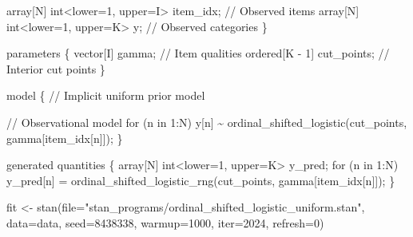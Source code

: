 \documentclass[
  letterpaper,
  DIV=11,
  numbers=noendperiod]{scrartcl}
\newenvironment{Shaded}{\begin{snugshade}}{\end{snugshade}}
\newcommand{\AttributeTok}[1]{\textcolor[rgb]{0.40,0.45,0.13}{#1}}
\newcommand{\CommentTok}[1]{\textcolor[rgb]{0.37,0.37,0.37}{#1}}
\newcommand{\ControlFlowTok}[1]{\textcolor[rgb]{0.00,0.23,0.31}{#1}}
\newcommand{\DataTypeTok}[1]{\textcolor[rgb]{0.68,0.00,0.00}{#1}}
\newcommand{\DecValTok}[1]{\textcolor[rgb]{0.68,0.00,0.00}{#1}}
\newcommand{\FunctionTok}[1]{\textcolor[rgb]{0.28,0.35,0.67}{#1}}
\newcommand{\KeywordTok}[1]{\textcolor[rgb]{0.00,0.23,0.31}{#1}}
\newcommand{\NormalTok}[1]{\textcolor[rgb]{0.00,0.23,0.31}{#1}}
\newcommand{\OtherTok}[1]{\textcolor[rgb]{0.00,0.23,0.31}{#1}}
\newcommand{\StringTok}[1]{\textcolor[rgb]{0.13,0.47,0.30}{#1}}
\begin{document}
\begin{codelisting}
\begin{Shaded}
\begin{Highlighting}[]
  \DataTypeTok{array}\NormalTok{[N] }\DataTypeTok{int}\NormalTok{\textless{}}\KeywordTok{lower}\NormalTok{=}\DecValTok{1}\NormalTok{, }\KeywordTok{upper}\NormalTok{=I\textgreater{} item\_idx; }\CommentTok{// Observed items}
  \DataTypeTok{array}\NormalTok{[N] }\DataTypeTok{int}\NormalTok{\textless{}}\KeywordTok{lower}\NormalTok{=}\DecValTok{1}\NormalTok{, }\KeywordTok{upper}\NormalTok{=K\textgreater{} y;        }\CommentTok{// Observed categories}
\NormalTok{\}}

\KeywordTok{parameters}\NormalTok{ \{}
  \DataTypeTok{vector}\NormalTok{[I] gamma;           }\CommentTok{// Item qualities}
  \DataTypeTok{ordered}\NormalTok{[K {-} }\DecValTok{1}\NormalTok{] cut\_points; }\CommentTok{// Interior cut points}
\NormalTok{\}}

\KeywordTok{model}\NormalTok{ \{}
  \CommentTok{// Implicit uniform prior model}

  \CommentTok{// Observational model}
  \ControlFlowTok{for}\NormalTok{ (n }\ControlFlowTok{in} \DecValTok{1}\NormalTok{:N)}
\NormalTok{    y[n] \textasciitilde{} ordinal\_shifted\_logistic(cut\_points, gamma[item\_idx[n]]);}
\NormalTok{\}}

\KeywordTok{generated quantities}\NormalTok{ \{}
  \DataTypeTok{array}\NormalTok{[N] }\DataTypeTok{int}\NormalTok{\textless{}}\KeywordTok{lower}\NormalTok{=}\DecValTok{1}\NormalTok{, }\KeywordTok{upper}\NormalTok{=K\textgreater{} y\_pred;}
  \ControlFlowTok{for}\NormalTok{ (n }\ControlFlowTok{in} \DecValTok{1}\NormalTok{:N)}
\NormalTok{    y\_pred[n] = ordinal\_shifted\_logistic\_rng(cut\_points,}
\NormalTok{                                             gamma[item\_idx[n]]);}
\NormalTok{\}}
\end{Highlighting}
\end{Shaded}

\end{codelisting}

\begin{Shaded}
\begin{Highlighting}[]
\NormalTok{fit }\OtherTok{\textless{}{-}} \FunctionTok{stan}\NormalTok{(}\AttributeTok{file=}\StringTok{"stan\_programs/ordinal\_shifted\_logistic\_uniform.stan"}\NormalTok{,}
            \AttributeTok{data=}\NormalTok{data, }\AttributeTok{seed=}\DecValTok{8438338}\NormalTok{,}
            \AttributeTok{warmup=}\DecValTok{1000}\NormalTok{, }\AttributeTok{iter=}\DecValTok{2024}\NormalTok{, }\AttributeTok{refresh=}\DecValTok{0}\NormalTok{)}
\end{Highlighting}
\end{Shaded}
\end{document}
